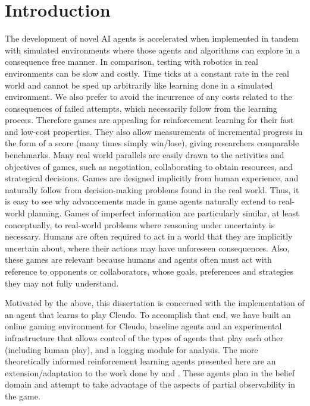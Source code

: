 \documentclass[msc, ai, twoside, notimes, logo, parskip, leftchapter, normalheadings]{infthesis}
\begin{document}
\chapter{Introduction}
The development of novel AI agents is accelerated when implemented in tandem with simulated environments where those agents and algorithms can explore in a consequence free manner. In comparison, testing with robotics in real environments can be slow and costly. Time ticks at a constant rate in the real world and cannot be sped up arbitrarily like learning done in a simulated environment. We also prefer to avoid the incurrence of any costs related to the consequences of failed attempts, which necessarily follow from the learning process. Therefore games are appealing for reinforcement learning for their fast and low-cost properties. They also allow measurements of incremental progress in the form of a score (many times simply win/lose), giving researchers comparable benchmarks. Many real world parallels are easily drawn to the activities and objectives of games, such as negotiation, collaborating to obtain resources, and strategical decisions. Games are designed implicitly from human experience, and naturally follow from decision-making problems found in the real world. Thus, it is easy to see why advancements made in game agents naturally extend to real-world planning. Games of imperfect information are particularly similar, at least conceptually, to real-world problems where reasoning under uncertainty is necessary. Humans are often required to act in a world that they are implicitly uncertain about, where their actions may have unforeseen consequences. Also, these games are relevant because humans and agents often must act with reference to opponents or collaborators, whose goals, preferences and strategies they may not fully understand. 

Motivated by the above, this dissertation is concerned with the implementation of an agent that learns to play Cleudo. To accomplish that end, we have built an online gaming environment for Cleudo, baseline agents and an experimental infrastructure that allows control of the types of agents that play each other (including human play), and a logging module for analysis. The more theoretically informed reinforcement learning agents presented here are an extension/adaptation to the work done by \citep{Silver-veness} and \citep{Mihai}. These agents plan in the belief domain and attempt to take advantage of the aspects of partial observability in the game. 
\end{document}
